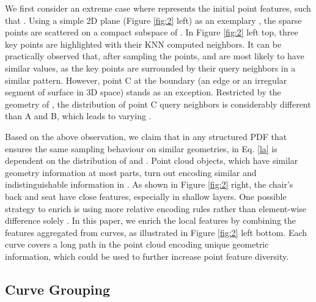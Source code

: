 \documentclass[10pt,twocolumn,letterpaper]{article}
\theoremstyle{definition}
\begin{document}
We first consider an extreme case where  represents the initial point features, such that . Using a simple 2D plane (Figure \ref{fig:2} left) as an exemplary , the sparse points are scattered on a compact subspace of . In Figure \ref{fig:2} left top, three key points are highlighted with their KNN computed neighbors. It can be practically observed that, after sampling the points,  and  are most likely to have similar values, as the key points are surrounded by their query neighbors in a similar pattern. However, point C at the boundary (an edge or an irregular segment of surface in 3D space) stands as an exception. Restricted by the geometry of , the distribution of point C query neighbors is considerably different than A and B, which leads to varying . 

Based on the above observation, we claim that in any structured PDF that ensures the same sampling behaviour on similar geometries,  in Eq. \ref{la} is dependent on the distribution of  and . Point cloud objects, which have similar geometry information at most parts, turn out encoding similar and indistinguishable information in . As shown in Figure \ref{fig:2} right, the chair's back and seat have close features, especially in shallow layers. One possible strategy to enrich  is using more relative encoding rules rather than element-wise difference solely \cite{hu2020randla, bytyqi2020local}. In this paper, we enrich the local features  by combining the features aggregated from curves, as illustrated in Figure \ref{fig:2} left bottom. Each curve covers a long path in the point cloud encoding unique geometric information, which could be used to further increase point feature diversity. 










































\subsection{Curve Grouping} \label{cg}
\end{document}
